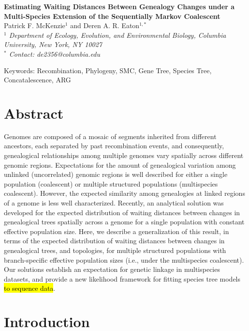 \documentclass[11pt]{article}
\begin{document}
\begin{center}
	{\bf \Large
		Estimating Waiting Distances Between Genealogy Changes under a \\[0.25cm]
		Multi-Species Extension of the Sequentially Markov Coalescent
	}\\[0.5cm]

	Patrick F. McKenzie$^{1}$ and Deren A. R. Eaton$^{1, *}$\\[0.25cm]

	\emph{
	$^{1}$ Department of Ecology, Evolution, and Environmental Biology, Columbia University, New York, NY 10027\\[0.5cm]
	$^{*}$ Contact: de2356@columbia.edu\\[0.5cm]
	}
\end{center}

Keywords: Recombination, Phylogeny, SMC, Gene Tree, Species Tree, Concatalescence, ARG

\RaggedRight

\section*{Abstract}
Genomes are composed of a mosaic of segments inherited from different ancestors, 
each separated by past recombination events, and consequently, genealogical
relationships among multiple genomes vary spatially across different genomic 
regions. Expectations for the amount of genealogical variation among unlinked 
(uncorrelated) genomic regions is well described for either a single 
population (coalescent) or multiple structured populations (multispecies coalescent).
However, the expected similarity among genealogies at linked regions of a 
genome is less well characterized. 
Recently, an analytical solution was developed for the expected 
distribution of waiting distances between changes in genealogical trees 
spatially across a genome for a single population with constant effective 
population size. Here, we describe a generalization of this 
result, in terms of the expected distribution of waiting distances between 
changes in genealogical trees, and topologies, for multiple structured populations
with branch-specific effective population sizes (i.e., under the multispecies 
coalescent). Our solutions establish an expectation for genetic linkage  
in multispecies datasets, and provide a new likelihood framework for 
fitting species tree models \hl{to sequence data}.

\section{Introduction}
\end{document}
